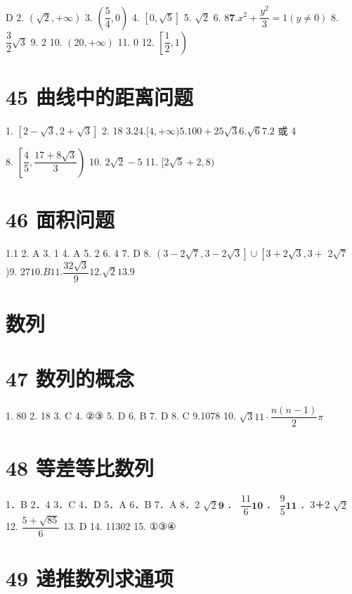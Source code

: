 \documentclass[10pt]{article}
\begin{document}
D 2. $\left( {\sqrt{2}, + \infty }\right) $ 3. $\left( {\dfrac{5}{4},0}\right) $ 4. $\left\lbrack  {0,\sqrt{5}}\right\rbrack  $ 5. $\sqrt{2}$ 6. $8\mathbf{7}.{x}^{2} + \dfrac{{y}^{2}}{3} = 1\left( {y \neq  0}\right)$ 8. $\dfrac{3}{2}\sqrt{3}$ 9. 2 10. $\left( {{20}, + \infty }\right) $ 11. 0 12. $\left\lbrack  {\dfrac{1}{2},1}\right)$

\section*{45 曲线中的距离问题}

1. $\left\lbrack  {2 - \sqrt{3},2 + \sqrt{3}}\right\rbrack  $ 2. 18 $3.24.\lbrack 4, + \infty ){5.100} + {25}\sqrt{3}6.\sqrt{6}7.2$ 或 4

8. $\left\lbrack  {\dfrac{4}{5},\dfrac{{17} + 8\sqrt{3}}{3}}\right)$ 10. $2\sqrt{2} - 5$ 11. $\lbrack 2\sqrt{5} + 2,8)$

\section*{46 面积问题}

1.1 2. A 3. 1 4. A 5. 2 6. 4 7. D 8. $\left( {3 - 2\sqrt{7},3 - 2\sqrt{3}}\right\rbrack   \cup  \left\lbrack  {3 + 2\sqrt{3},3 + }\right.$  $2\sqrt{7}$ )9. ${27}{10}.{B}{11}.\dfrac{{32}\sqrt{3}}{9}{12}.\sqrt{2}{13}.9$

\section*{数列}

\section*{47 数列的概念}

1. 80 2. 18 3. C 4. ②③ 5. D 6. B 7. D 8. C 9.1078 10. $\sqrt{3}{11} \cdot  \dfrac{n\left( {n - 1}\right) }{2}\pi$

\section*{48 等差等比数列}

1．B 2．4 3．C 4．D 5．A 6．B 7．A 8．2 $\sqrt{2}\mathbf{9}$ ． $\dfrac{11}{6}\mathbf{{10}}$ ． $\dfrac{9}{5}\mathbf{{11}}$ ．3＋2 $\sqrt{2}$ 12. $\dfrac{5 + \sqrt{85}}{6}$ 13. D 14. 11302 15. ①③④

\section*{49 递推数列求通项}
\end{document}
